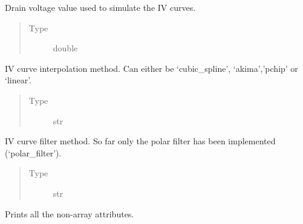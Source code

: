 \documentclass[letterpaper,10pt,english,openany, oneside]{sphinxmanual}
\begin{document}
\begin{fulllineitems}
\begin{fulllineitems}
\label{\detokenize{index:fompy.fds.FompyDataset.drain_bias_value}}
Drain voltage value used to simulate the IV curves.
\begin{quote}\begin{description}
\item[{Type}] \leavevmode
double

\end{description}\end{quote}

\end{fulllineitems}


\begin{fulllineitems}
\label{\detokenize{index:fompy.fds.FompyDataset.interpolation}}
IV curve interpolation method. Can either be ‘cubic\_spline’,
‘akima’,’pchip’ or ‘linear’.
\begin{quote}\begin{description}
\item[{Type}] \leavevmode
str

\end{description}\end{quote}

\end{fulllineitems}


\begin{fulllineitems}
\label{\detokenize{index:fompy.fds.FompyDataset.filter}}
IV curve filter method. So far only the polar filter has been implemented (‘polar\_filter’).
\begin{quote}\begin{description}
\item[{Type}] \leavevmode
str

\end{description}\end{quote}

\end{fulllineitems}


\begin{fulllineitems}
\label{\detokenize{index:fompy.fds.FompyDataset.print_parameters}}
Prints all the non-array attributes.

\end{fulllineitems}


\end{fulllineitems}
\end{document}
